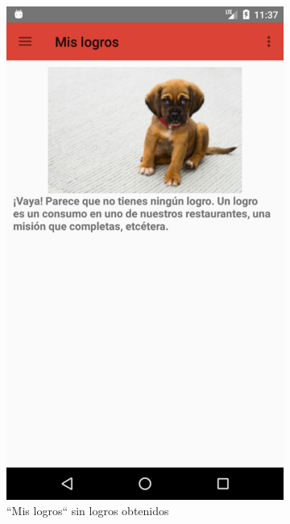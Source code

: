 \documentclass[twoside]{report}
\begin{document}
\begin{figure}[H]
\begin{center}
	\begin{subfigure}[t]{.3\linewidth}
		\includegraphics[scale=0.2]{images/userguide/5.png}
		\caption{“Mis logros“ sin logros obtenidos}
	\end{subfigure}\hspace{5mm}%
	\begin{subfigure}[t]{.3\linewidth} 

\end{subfigure}
\end{center}
\end{figure}
\end{document}
